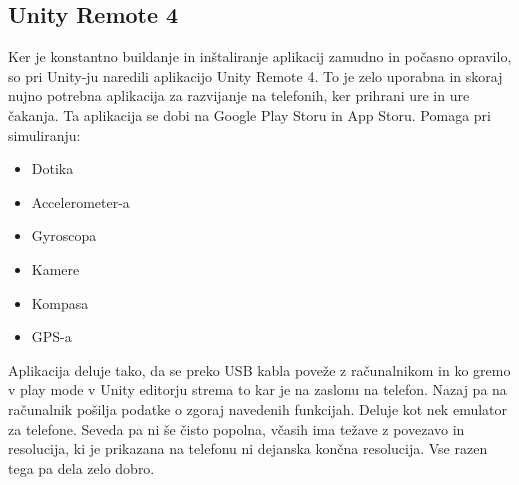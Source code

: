 {\color{indiagreen}\subsection{Unity Remote 4}}
Ker je konstantno buildanje in inštaliranje aplikacij zamudno in počasno opravilo, so pri Unity-ju naredili aplikacijo Unity Remote 4. To je zelo uporabna in skoraj nujno potrebna aplikacija za razvijanje na telefonih, ker prihrani ure in ure čakanja. Ta aplikacija se dobi na Google Play Storu in App Storu. Pomaga pri simuliranju:
\begin{itemize}
	\item Dotika
	\item Accelerometer-a
	\item Gyroscopa
	\item Kamere
	\item Kompasa
	\item GPS-a
\end{itemize}
Aplikacija deluje tako, da se preko USB kabla poveže z računalnikom in ko gremo v play mode v Unity editorju strema to kar je na zaslonu na telefon. Nazaj pa na računalnik pošilja podatke o zgoraj navedenih funkcijah. Deluje kot nek emulator za telefone. Seveda pa ni še čisto popolna, včasih ima težave z povezavo in resolucija, ki je prikazana na telefonu ni dejanska končna resolucija. Vse razen tega pa dela zelo dobro.
